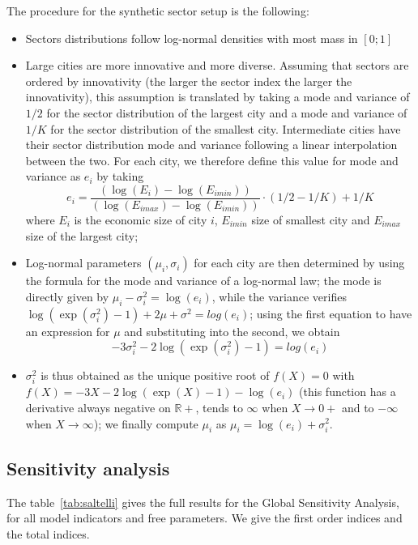 The procedure for the synthetic sector setup is the following:
\begin{itemize}
    \item Sectors distributions follow log-normal densities with most mass in $\left[0;1\right]$
    \item Large cities are more innovative and more diverse. Assuming that sectors are ordered by innovativity (the larger the sector index the larger the innovativity), this assumption is translated by taking a mode and variance of $1/2$ for the sector distribution of the largest city and a mode and variance of $1/K$ for the sector distribution of the smallest city. Intermediate cities have their sector distribution mode and variance following a linear interpolation between the two. For each city, we therefore define this value for mode and variance as $e_i$ by taking
    \[
    e_i = \frac{(\log(E_i) - \log(E_{imin}))}{(\log(E_{imax}) - \log(E_{imin}))} \cdot (1/2 - 1/K) + 1/K
    \]
    where $E_i$ is the economic size of city $i$, $E_{imin}$ size of smallest city and $E_{imax}$ size of the largest city;
    \item Log-normal parameters $(\mu_i,\sigma_i)$ for each city are then determined by using the formula for the mode and variance of a log-normal law; the mode is directly given by $\mu_i - \sigma_i^2 = \log(e_i)$, while the variance verifies $\log(\exp(\sigma_i^2) - 1) + 2\mu + \sigma^2  = log(e_i)$; using the first equation to have an expression for $\mu$ and substituting into the second, we obtain
    \[
    -3 \sigma_i^2 - 2 \log(\exp(\sigma_i^2) - 1) = log(e_i)
    \]
    \item $\sigma_i^2$ is thus obtained as the unique positive root of $f(X)=0$ with $f(X) = -3X - 2 \log(\exp(X) - 1) - \log(e_i)$ (this function has a derivative always negative on $\mathbb{R}+$, tends to $\infty$ when $X \rightarrow 0+$ and to $-\infty$ when $X \rightarrow \infty$); we finally compute $\mu_i$ as $\mu_i = \log(e_i) + \sigma_i^2$.
\end{itemize}




\subsection*{Sensitivity analysis}

The table~\ref{tab:saltelli} gives the full results for the Global Sensitivity Analysis, for all model indicators and free parameters. We give the first order indices and the total indices.

